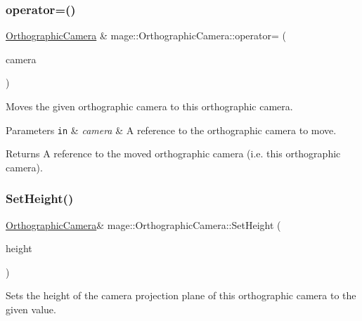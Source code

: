 \subsubsection{\texorpdfstring{operator=()}{operator=()}\hspace{0.1cm}{\footnotesize\ttfamily [2/2]}}
{\footnotesize\ttfamily \hyperlink{classmage_1_1_orthographic_camera}{Orthographic\+Camera} \& mage\+::\+Orthographic\+Camera\+::operator= (\begin{DoxyParamCaption}\item[{\hyperlink{classmage_1_1_orthographic_camera}{Orthographic\+Camera} \&\&}]{camera }\end{DoxyParamCaption})\hspace{0.3cm}{\ttfamily [default]}}

Moves the given orthographic camera to this orthographic camera.


\begin{DoxyParams}[1]{Parameters}
\mbox{\tt in}  & {\em camera} & A reference to the orthographic camera to move. \\
\hline
\end{DoxyParams}
\begin{DoxyReturn}{Returns}
A reference to the moved orthographic camera (i.\+e. this orthographic camera). 
\end{DoxyReturn}
\hypertarget{classmage_1_1_orthographic_camera_a015e8dbc6cf3fcb199626db1069d791d}{}\label{classmage_1_1_orthographic_camera_a015e8dbc6cf3fcb199626db1069d791d} 
\subsubsection{\texorpdfstring{Set\+Height()}{SetHeight()}}
{\footnotesize\ttfamily \hyperlink{classmage_1_1_orthographic_camera}{Orthographic\+Camera}\& mage\+::\+Orthographic\+Camera\+::\+Set\+Height (\begin{DoxyParamCaption}\item[{float}]{height }\end{DoxyParamCaption})\hspace{0.3cm}{\ttfamily [noexcept]}}

Sets the height of the camera projection plane of this orthographic camera to the given value.


